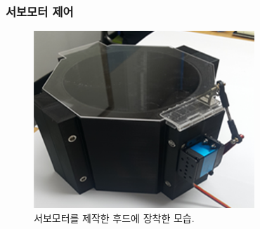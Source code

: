 \documentclass[twoside,11pt]{gshs_thesis}
\begin{document}


\subsubsection{서보모터 제어}

 \begin{figure}[h]
	\begin{center}
		\includegraphics[width = 8.3cm]{servo2}
	\end{center}
	\caption{서보모터를 제작한 후드에 장착한 모습.}
	\label{motorcover}
\end{figure}
\end{document}
